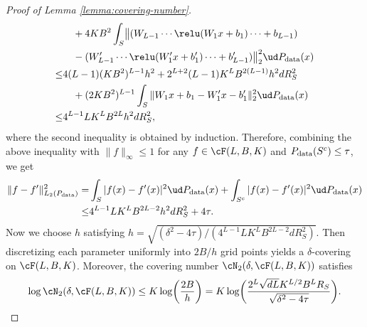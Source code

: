 \begin{proof}[Proof of Lemma \ref{lemma:covering-number}]
\begin{align*}
    & \quad+  4 K B^2 \int_{S}   \bigl\|   (W_{L-1}\cdots \relu(W_1 x +b_1) \cdots +b_{L-1})  \\
    &\quad -   (W_{L-1}' \cdots \relu(W_1' x +b_1') \cdots +b_{L-1}')  \bigr\|_2^2 \ud P_{\rm data}(x)\\
    \leq & 4 (L-1) (K B^2)^{L-1} h^2+ 2^{L+2} (L-1) K^L B^{2(L-1)} h^2 d R_S^2 \\
    & \quad + ( 2 K B^2)^{L-1} \int_{S}   \norm{ W_1 x +b_1  -   W_1' x -b_1' }_2^2 \ud P_{\rm data}(x)\\
    \leq & 4^{L-1} L K^L B^{2L} h^2 d R_S^2,
\end{align*}
where the second inequality is obtained by induction. Therefore, combining the above inequality with $\|f\|_\infty \leq 1$ for any $f \in\cF(L,B,K)$ and $P_{\rm data}(S^c) \leq \tau$, we get
\begin{align*}
    \norm{f-f'}^2_{L_2(P_{\rm data})} =& \int_{S}  | f(x) - f'(x) |^2  \ud P_{\rm data}(x) +  \int_{S^c}  | f(x) - f'(x) |^2  \ud P_{\rm data}(x) \\
    \leq &  4^{L-1} L K^L B^{2L-2} h^2 d R_S^2 + 4\tau.
\end{align*}
Now we choose $h$ satisfying $h=\sqrt{(\delta^2-4\tau)/(4^{L-1}L K^L B^{2L-2} d R_S^2)}$. Then discretizing each parameter uniformly into $2B/h$ grid points yields a $\delta$-covering on $\cF(L, B,K)$.  Moreover, the covering number $\cN_2(\delta, \cF(L, B,K))$ satisfies
\begin{align*}
    \log \cN_2(\delta, \cF( L, B,K)) \leq K \log\biggl( \frac{2B}{h} \biggr) = K \log\biggl( \frac{2^L \sqrt{dL} K^{L/2} B^L R_S }{\sqrt{\delta^2-4\tau}} \biggr).
\end{align*}
\end{proof}


